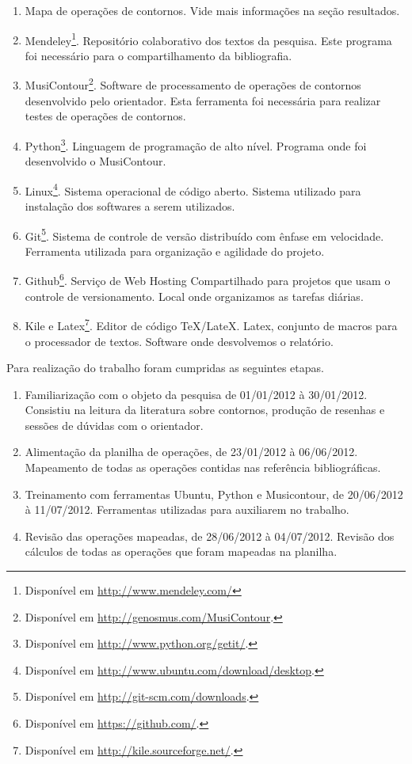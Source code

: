 \documentclass[11pt]{article}
\begin{document}
\begin{enumerate}
\item Mapa de operações de contornos. Vide mais 
  informações na seção resultados.
\item Mendeley\footnote{Disponível em
    \url{http://www.mendeley.com/}}. Repositório colaborativo dos
  textos da pesquisa. Este programa foi necessário para o
  compartilhamento da bibliografia.
\item MusiContour\footnote{Disponível em
    \url{http://genosmus.com/MusiContour}.}. Software de processamento
  de operações de contornos desenvolvido pelo orientador. Esta
  ferramenta foi necessária para realizar testes de operações de
  contornos.
\item Python\footnote{Disponível em
  \url{http://www.python.org/getit/}.}. Linguagem de programação de
  alto nível. Programa onde foi desenvolvido o MusiContour.
\item Linux\footnote{Disponível em
  \url{http://www.ubuntu.com/download/desktop}.}. Sistema operacional
  de código aberto. Sistema utilizado para instalação dos softwares a
  serem utilizados.
\item Git\footnote{Disponível em
  \url{http://git-scm.com/downloads}.}. Sistema de controle de versão
distribuído com ênfase em velocidade. Ferramenta utilizada para organização
e agilidade do projeto.
\item Github\footnote{Disponível em
  \url{https://github.com/}.}. Serviço de Web Hosting Compartilhado
para projetos que usam o controle de versionamento. Local onde organizamos
as tarefas diárias.
\item Kile e Latex\footnote{Disponível em
  \url{http://kile.sourceforge.net/}.}. Editor de código
TeX/LateX. Latex, conjunto de macros para o processador de textos. Software
onde desvolvemos o relatório.
\end{enumerate}

Para realização do trabalho foram cumpridas as seguintes etapas.

\begin{enumerate}
\item Familiarização com o objeto da pesquisa de 01/01/2012 à 30/01/2012.
Consistiu na leitura da literatura sobre contornos, produção de resenhas
e sessões de dúvidas com o orientador.
\item Alimentação da planilha de operações, de 23/01/2012 à 06/06/2012.
Mapeamento de todas as operações contidas nas referência bibliográficas.
\item Treinamento com ferramentas Ubuntu, Python e Musicontour, de 20/06/2012 à 11/07/2012.
Ferramentas utilizadas para auxiliarem no trabalho.
\item Revisão das operações mapeadas, de 28/06/2012 à 04/07/2012.
Revisão dos cálculos de todas as operações que foram mapeadas na planilha.
\end{enumerate}
\end{document}
